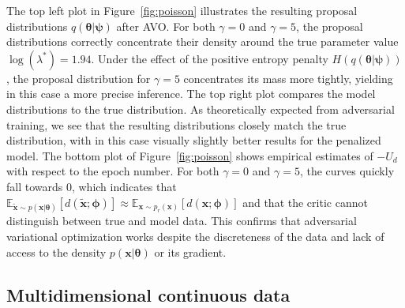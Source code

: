 \documentclass[twocolumn,superscriptaddress,aps]{revtex4-1}
\newcommand{\bftheta}{{\bm \theta}}
\newcommand{\bfpsi}{{\bm \psi}}
\newcommand{\bfphi}{{\bm \phi}}
\newcommand{\bfx}{\mathbf{x}}
\theoremstyle{plain}
\begin{document}
The top left plot in Figure~\ref{fig:poisson} illustrates the resulting proposal
distributions $q(\bftheta|\bfpsi)$ after AVO.  For
both $\gamma=0$ and $\gamma=5$, the proposal distributions correctly concentrate
their density around the true parameter value $\log(\lambda^*) = 1.94$. Under
the effect of the positive entropy penalty $H(q(\bftheta|\bfpsi))$,
the proposal distribution for $\gamma=5$ concentrates its mass more tightly,
yielding in this case a more precise inference.  The top right plot compares the
model distributions to the true distribution.  As theoretically expected from
adversarial training, we see that the resulting distributions closely match
the true distribution, with in this case visually slightly better results for the penalized
model.  The bottom plot of Figure~\ref{fig:poisson} shows empirical estimates
of $-U_d$ with respect to the epoch number. For both $\gamma=0$ and $\gamma=5$,
the curves quickly fall towards $0$, which indicates that
$\mathbb{E}_{\tilde{\mathbf{x}} \sim p(\mathbf{x}|\bftheta)}
[d(\tilde{\mathbf{x}};\bfphi)] \approx \mathbb{E}_{\mathbf{x} \sim
p_r(\mathbf{x})} [d(\mathbf{x};\bfphi)]$ and that the critic cannot distinguish
between true and model data. This confirms that adversarial variational optimization
works despite the discreteness of the data and lack of access to the
density $p(\bfx | \bftheta)$ or its gradient.

\subsection{Multidimensional continuous data}
\end{document}
